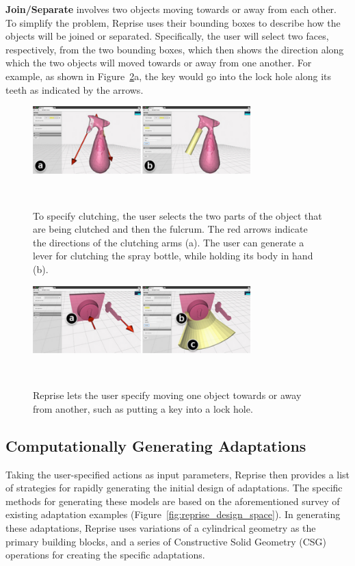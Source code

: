 \textbf{Join/Separate} involves two objects moving towards or away from each other. To simplify the problem, Reprise uses their bounding boxes to describe how the objects will be joined or separated. Specifically, the user will select two faces, respectively, from the two bounding boxes, which then shows the direction along which the two objects will moved towards or away from one another. For example, as shown in Figure~\ref{fig:reprise_joinseparate}a, the key would go into the lock hole along its teeth as indicated by the arrows.

\begin{figure}[t]
  \centering
  \includegraphics[width=0.75\textwidth]{figures/reprise_clutch_v1.pdf}
  \caption{To specify clutching, the user selects the two parts of the object that are being clutched and then the fulcrum. The red arrows indicate the directions of the clutching arms (a). The user can generate a lever for clutching the spray bottle, while holding its body in hand (b).}~\label{fig:reprise_clutch}
\end{figure}

\begin{figure}[t]
  \centering
  \includegraphics[width=0.75\textwidth]{figures/reprise_joinseparate_v1.pdf}
  \caption{Reprise lets the user specify moving one object towards or away from another, such as putting a key into a lock hole.}~\label{fig:reprise_joinseparate}
\end{figure}


\subsection{Computationally Generating Adaptations}
Taking the user-specified actions as input parameters, Reprise then provides a list of strategies for rapidly generating the initial design of adaptations. The specific methods for generating these models are based on the aforementioned survey of existing adaptation examples (Figure~\ref{fig:reprise_design_space}). In generating these adaptations, Reprise uses variations of a cylindrical geometry as the primary building blocks, and a series of Constructive Solid Geometry (CSG) operations for creating the specific adaptations. 

